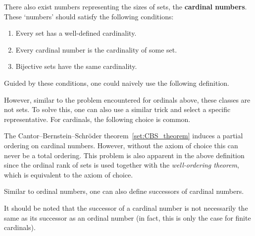     There also exist numbers representing the sizes of sets, the \textbf{cardinal numbers}. These `numbers' should satisfy the following conditions:
    \begin{enumerate}
        \item Every set has a well-defined cardinality.
        \item Every cardinal number is the cardinality of some set.
        \item Bijective sets have the same cardinality.
    \end{enumerate}
    Guided by these conditions, one could naively use the following definition.

    However, similar to the problem encountered for ordinals above, these classes are not sets. To solve this, one can also use a similar trick and select a specific representative. For cardinals, the following choice is common.

    \begin{remark}[Ordering]
        The Cantor--Bernstein--Schr\"oder theorem~\ref{set:CBS_theorem} induces a partial ordering on cardinal numbers. However, without the axiom of choice this can never be a total ordering. This problem is also apparent in the above definition since the ordinal rank of sets is used together with the \textit{well-ordering theorem}, which is equivalent to the axiom of choice.
    \end{remark}

    Similar to ordinal numbers, one can also define successors of cardinal numbers.
    \begin{remark}
        It should be noted that the successor of a cardinal number is not necessarily the same as its successor as an ordinal number (in fact, this is only the case for finite cardinals).
    \end{remark}

